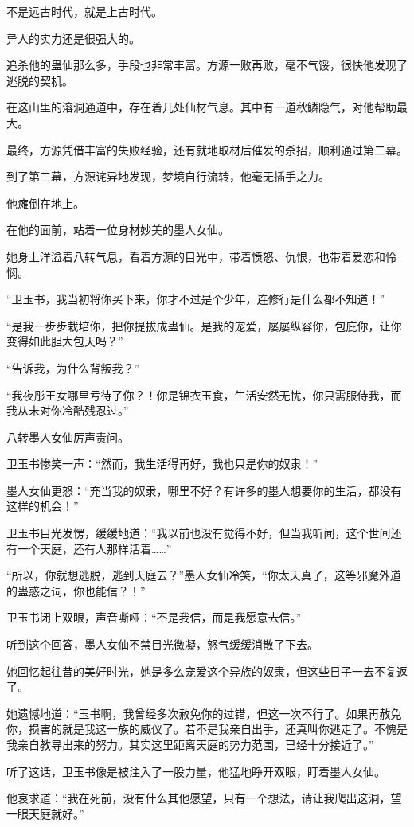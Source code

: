 \begin{this_body}
不是远古时代，就是上古时代。

异人的实力还是很强大的。

追杀他的蛊仙那么多，手段也非常丰富。方源一败再败，毫不气馁，很快他发现了逃脱的契机。

在这山里的溶洞通道中，存在着几处仙材气息。其中有一道秋鳞隐气，对他帮助最大。

最终，方源凭借丰富的失败经验，还有就地取材后催发的杀招，顺利通过第二幕。

到了第三幕，方源诧异地发现，梦境自行流转，他毫无插手之力。

他瘫倒在地上。

在他的面前，站着一位身材妙美的墨人女仙。

她身上洋溢着八转气息，看着方源的目光中，带着愤怒、仇恨，也带着爱恋和怜悯。

“卫玉书，我当初将你买下来，你才不过是个少年，连修行是什么都不知道！”

“是我一步步栽培你，把你提拔成蛊仙。是我的宠爱，屡屡纵容你，包庇你，让你变得如此胆大包天吗？”

“告诉我，为什么背叛我？”

“我夜彤王女哪里亏待了你？！你是锦衣玉食，生活安然无忧，你只需服侍我，而我从未对你冷酷残忍过。”

八转墨人女仙厉声责问。

卫玉书惨笑一声：“然而，我生活得再好，我也只是你的奴隶！”

墨人女仙更怒：“充当我的奴隶，哪里不好？有许多的墨人想要你的生活，都没有这样的机会！”

卫玉书目光发愣，缓缓地道：“我以前也没有觉得不好，但当我听闻，这个世间还有一个天庭，还有人那样活着……”

“所以，你就想逃脱，逃到天庭去？”墨人女仙冷笑，“你太天真了，这等邪魔外道的蛊惑之词，你也能信？！”

卫玉书闭上双眼，声音嘶哑：“不是我信，而是我愿意去信。”

听到这个回答，墨人女仙不禁目光微凝，怒气缓缓消散了下去。

她回忆起往昔的美好时光，她是多么宠爱这个异族的奴隶，但这些日子一去不复返了。

她遗憾地道：“玉书啊，我曾经多次赦免你的过错，但这一次不行了。如果再赦免你，损害的就是我这一族的威仪了。若不是我亲自出手，还真叫你逃走了。不愧是我亲自教导出来的努力。其实这里距离天庭的势力范围，已经十分接近了。”

听了这话，卫玉书像是被注入了一股力量，他猛地睁开双眼，盯着墨人女仙。

他哀求道：“我在死前，没有什么其他愿望，只有一个想法，请让我爬出这洞，望一眼天庭就好。”


\end{this_body}
